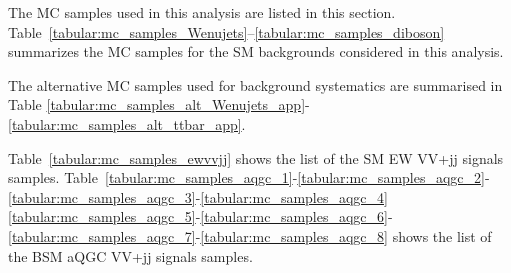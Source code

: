 
The MC samples used in this analysis are listed in this section.
Table~\ref{tabular:mc_samples_Wenujets}--\ref{tabular:mc_samples_diboson} summarizes the MC samples for the SM backgrounds considered in this analysis.

The alternative MC samples used for background systematics are summarised in Table 
\ref{tabular:mc_samples_alt_Wenujets_app}-\ref{tabular:mc_samples_alt_ttbar_app}.

Table~\ref{tabular:mc_samples_ewvvjj} shows the list of the SM EW VV+jj signals samples.
Table~\ref{tabular:mc_samples_aqgc_1}-\ref{tabular:mc_samples_aqgc_2}-\ref{tabular:mc_samples_aqgc_3}-\ref{tabular:mc_samples_aqgc_4}
\ref{tabular:mc_samples_aqgc_5}-\ref{tabular:mc_samples_aqgc_6}-\ref{tabular:mc_samples_aqgc_7}-\ref{tabular:mc_samples_aqgc_8}
shows the list of the BSM aQGC VV+jj signals samples.


